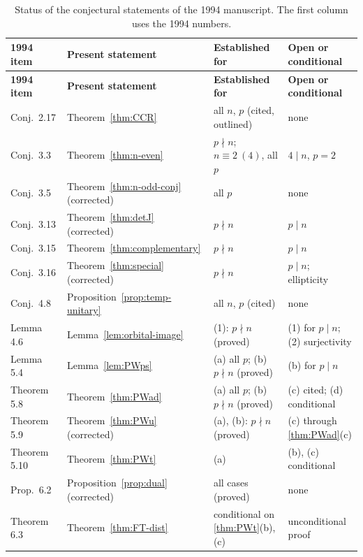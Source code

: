 \documentclass[12pt,letterpaper]{article}
\numberwithin{equation}{section}
\theoremstyle{definition}
\begin{document}
{\small
\begin{longtable}{@{}>{\raggedright}p{2.1cm}>{\raggedright}p{4.6cm}>{\raggedright}p{4.3cm}>{\raggedright\arraybackslash}p{4.0cm}@{}}
\caption{Status of the conjectural statements of the 1994 manuscript.  The first column uses the 1994 numbers.}\label{tab:status}\\
\toprule
\textbf{1994 item} & \textbf{Present statement} & \textbf{Established for} & \textbf{Open or conditional}\\
\midrule
\endfirsthead
\toprule
\textbf{1994 item} & \textbf{Present statement} & \textbf{Established for} & \textbf{Open or conditional}\\
\midrule
\endhead
Conj.\ 2.17 & Theorem~\ref{thm:CCR} & all $n$, $p$ (cited, outlined) & none\\
Conj.\ 3.3 & Theorem~\ref{thm:n-even} & $p\nmid n$; $n\equiv2\ (4)$, all $p$ & $4\mid n$, $p=2$\\
Conj.\ 3.5 & Theorem~\ref{thm:n-odd-conj} (corrected) & all $p$ & none\\
Conj.\ 3.13 & Theorem~\ref{thm:detJ} (corrected) & $p\nmid n$ & $p\mid n$\\
Conj.\ 3.15 & Theorem~\ref{thm:complementary} & $p\nmid n$ & $p\mid n$\\
Conj.\ 3.16 & Theorem~\ref{thm:special} (corrected) & $p\nmid n$ & $p\mid n$; ellipticity\\
Conj.\ 4.8 & Proposition~\ref{prop:temp-unitary} & all $n$, $p$ (cited) & none\\
Lemma 4.6 & Lemma~\ref{lem:orbital-image} & (1): $p\nmid n$ (proved) & (1) for $p\mid n$; (2) surjectivity\\
Lemma 5.4 & Lemma~\ref{lem:PWps} & (a) all $p$; (b) $p\nmid n$ (proved) & (b) for $p\mid n$\\
Theorem 5.8 & Theorem~\ref{thm:PWad} & (a) all $p$; (b) $p\nmid n$ (proved) & (c) cited; (d) conditional\\
Theorem 5.9 & Theorem~\ref{thm:PWu} (corrected) & (a), (b): $p\nmid n$ (proved) & (c) through \ref{thm:PWad}(c)\\
Theorem 5.10 & Theorem~\ref{thm:PWt} & (a) & (b), (c) conditional\\
Prop.\ 6.2 & Proposition~\ref{prop:dual} (corrected) & all cases (proved) & none\\
Theorem 6.3 & Theorem~\ref{thm:FT-dist} & conditional on \ref{thm:PWt}(b),(c) & unconditional proof\\
\bottomrule
\end{longtable}}
\end{document}
